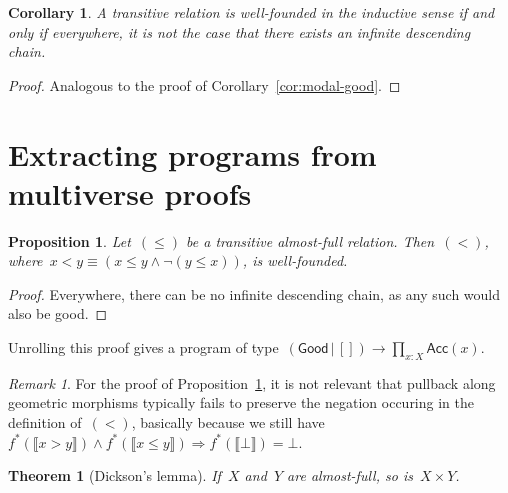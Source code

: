 \documentclass[oneside,reqno]{amsart}
\theoremstyle{definition}
\theoremstyle{plain}
\newtheorem{prop}[defn]{Proposition}
\newtheorem{cor}[defn]{Corollary}
\newtheorem{thm}[defn]{Theorem}
\theoremstyle{remark}
\newtheorem{rem}[defn]{Remark}
\renewcommand{\_}{\mathpunct{.}\,}
\newcommand{\?}{\,{:}\,}
\begin{document}
\begin{cor}A transitive relation is well-founded in the inductive sense
if and only if everywhere, it is not the case that there exists an infinite
descending chain.\end{cor}

\begin{proof}Analogous to the proof of
Corollary~\ref{cor:modal-good}.\end{proof}


\section{Extracting programs from multiverse proofs}
\label{sect:program-extraction}

\begin{prop}\label{prop:af-wf}Let~$({\leq})$ be a transitive almost-full relation.
Then~$({<})$, where~$x < y \equiv (x \leq y \wedge \neg(y \leq x))$,
is well-founded.\end{prop}

\begin{proof}Everywhere, there can be no infinite descending chain, as any
such would also be good.\end{proof}

Unrolling this proof gives a program of type~$(\textsf{Good} \,|\, []) \to
\prod_{x:X} \textsf{Acc}(x)$.

\begin{rem}For the proof of Proposition~\ref{prop:af-wf}, it is not relevant
that pullback along geometric morphisms typically fails to preserve the
negation occuring in the definition of~$({<})$, basically because we still
have~$f^*(\llbracket x > y \rrbracket) \wedge f^*(\llbracket x \leq y
\rrbracket) \Rightarrow f^*(\llbracket\bot\rrbracket) = \bot$.\end{rem}

\begin{thm}[Dickson's lemma] If~$X$ and~$Y$ are almost-full,
so is~$X \times Y$.\end{thm}
\end{document}
